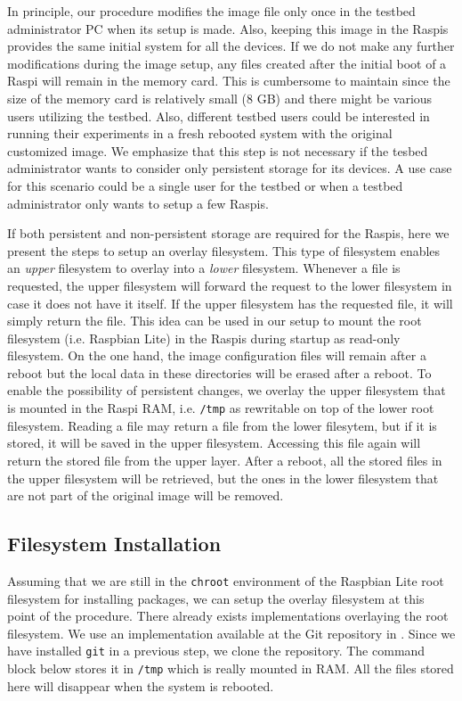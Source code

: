 \label{sec:overlay_fs}
In principle, our procedure modifies the image file only once in
the testbed administrator \ac{PC} when its setup is made. Also, keeping
this image in the \ac{Raspi}s provides the same initial system for all
the devices. If we do not make any further modifications during
the image setup, any files created after the initial boot of a \ac{Raspi}
will remain in the memory card. This is cumbersome to maintain since
the size of the memory card is relatively small (8 GB) and there
might be various users utilizing the testbed. Also, different testbed
users could be interested in running their experiments in a fresh
rebooted system with the original customized image. We
emphasize that this step is not necessary if the tesbed administrator
wants to consider only persistent storage for its devices. A use case
for this scenario could be a single user for the testbed or when a testbed
administrator only wants to setup a few \ac{Raspi}s.

If both persistent and non-persistent storage are required for
the \ac{Raspi}s, here we present the steps to setup an overlay filesystem.
This type of filesystem enables an \textit{upper} filesystem to overlay
into a \textit{lower} filesystem. Whenever a file is requested, the upper
filesystem will forward the request to the lower filesystem in case it
does not have it itself. If the upper filesystem has the requested file,
it will simply return the file. This idea can be used in our setup to mount
the root filesystem (i.e. Raspbian Lite) in the \ac{Raspi}s during startup
as read-only filesystem. On the one hand, the image configuration files
will remain after a reboot but the local data in these directories will be
erased after a reboot. To enable the
possibility of persistent changes, we overlay the upper filesystem that is
mounted in the \ac{Raspi} \ac{RAM}, i.e. \texttt{/tmp} as rewritable
on top of the lower root filesystem. Reading a file may return a
file from the lower filesytem, but if it is stored, it will be saved in
the upper filesystem. Accessing this file again will return
the stored file from the upper layer. After a reboot, all the stored files
in the upper filesystem will be retrieved, but the ones in the lower
filesystem that are not part of the original image will be removed.

\subsection{Filesystem Installation}

Assuming that we are still in the \texttt{chroot} environment of the
Raspbian Lite root filesystem for installing packages, we can setup the
overlay filesystem at this point of the procedure. There already exists
implementations overlaying the root filesystem. We use an implementation
available at the Git repository in \cite{overlayroot}. Since we have
installed \texttt{git} in a previous step, we clone the repository. The
command block below stores it in \texttt{/tmp} which is really mounted in
\ac{RAM}. All the files stored here will disappear when the system is
rebooted.

